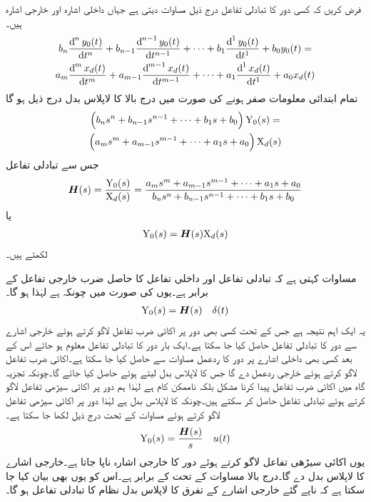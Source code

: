فرض کریں کہ کسی دور کا تبادلی تفاعل درج ذیل مساوات دیتی ہے جہاں  داخلی اشارہ اور  خارجی اشارہ ہیں۔
\begin{multline*}
b_n\frac{\dif^{\, n} y_0(t)}{\dif t^{n}}+b_{n-1}\frac{\dif^{\, n-1} y_0(t)}{\dif t^{n-1}}+\cdots+b_{1}\frac{\dif^{\, 1} y_0(t)}{\dif t^{1}}+b_0 y_0(t)=\\
a_m\frac{\dif^{\, m} x_d(t)}{\dif t^{m}}+a_{m-1}\frac{\dif^{\, m-1} x_d(t)}{\dif t^{m-1}}+\cdots+a_{1}\frac{\dif^{\, 1} x_d(t)}{\dif t^{1}}+a_0 x_d(t)
\end{multline*}
تمام ابتدائی معلومات صفر ہونے کی صورت میں درج بالا کا لاپلاس بدل درج ذیل ہو گا
\begin{multline*}
\left(b_n s^n+b_{n-1}s^{n-1}+\cdots +b_1 s+b_0\right){\textup{Y}_0(s)}=\\
\left(a_m s^m+a_{m-1}s^{m-1}+\cdots+a_1 s+a_0\right){\textup{X}_d(s)}
\end{multline*}
جس سے تبادلی تفاعل  
\begin{align*}
{\ensuremath{{\boldsymbol{H}}}}(s)=\frac{{\textup{Y}_0(s)}}{{\textup{X}_d(s)}}=\frac{a_m s^m+a_{m-1}s^{m-1}+\cdots+a_1 s+a_0}{b_n s^n+b_{n-1}s^{n-1}+\cdots +b_1 s+b_0}
\end{align*}
یا
\begin{align}\label{مساوات_لاپلاس_استعمال_عمومی_الف}
{\textup{Y}_0(s)}={{\boldsymbol{H}}}(s){\textup{X}_d(s)}
\end{align}
لکھتے ہیں۔

مساوات  کہتی ہے کہ تبادلی تفاعل  اور داخلی تفاعل  کا حاصل ضرب خارجی تفاعل  کے برابر ہے۔یوں  کی صورت میں چونکہ  ہے لہٰذا  ہو گا۔
\begin{align}\label{مساوات_لاپلاس_استعمال_تبادلی_تفاعل_اور_خارجی_اشارہ}
{\textup{Y}_0(s)}={{\boldsymbol{H}}}(s)\quad  \delta(t)
\end{align}
یہ ایک اہم نتیجہ ہے جس کے تحت کسی بھی دور پر اکائی ضرب تفاعل لاگو کرتے ہوئے خارجی اشارے سے دور کا تبادلی تفاعل حاصل کیا جا سکتا ہے۔ایک بار دور کا تبادلی تفاعل معلوم ہو جائے اس کے بعد کسی بھی داخلی اشارے پر دور کا ردعمل مساوات  سے حاصل کیا جا سکتا ہے۔اکائی ضرب تفاعل لاگو کرتے ہوئے خارجی ردعمل  دے گا جس کا لاپلاس بدل لیتے ہوئے  حاصل کیا جائے گا۔چونکہ تجزیہ گاہ میں اکائی ضرب تفاعل پیدا کرنا مشکل بلکہ ناممکن کام ہے لہٰذا ہم دور پر اکائی سیڑھی تفاعل لاگو کرتے ہوئے تبادلی تفاعل حاصل کر سکتے ہیں۔چونکہ  کا لاپلاس بدل  ہے لہٰذا دور پر اکائی سیڑھی تفاعل لاگو کرتے ہوئے مساوات  کے تحت درج ذیل لکھا جا سکتا ہے۔
\begin{align}
{\textup{Y}_0(s)}=\frac{{{\boldsymbol{H}}}(s)}{s} \quad u(t)
\end{align}
یوں اکائی سیڑھی تفاعل لاگو کرتے ہوئے دور کا خارجی اشارہ  ناپا جاتا ہے۔خارجی اشارے کا لاپلاس بدل  دے گا۔درج بالا مساوات کے تحت  کے برابر ہے۔اس کو یوں بھی بیان کیا جا سکتا ہے کہ ناپے گئے خارجی اشارے کے تفرق  کا لاپلاس بدل نظام کا تبادلی تفاعل  ہو گا۔

